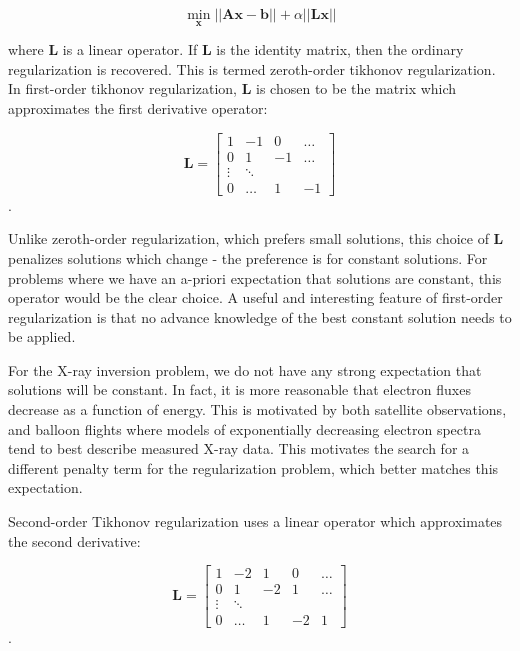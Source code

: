 $$\min_{\mathbf{x}} \vert \vert \mathbf{A} \mathbf{x} - \mathbf{b} \vert \vert + \alpha \vert \vert \mathbf{L} \mathbf{x} \vert \vert$$

where $\mathbf{L}$ is a linear operator. If $\mathbf{L}$ is the identity matrix, then the ordinary regularization is recovered. This is termed zeroth-order tikhonov regularization. In first-order tikhonov regularization, $\mathbf{L}$ is chosen to be the matrix which approximates the first derivative operator:

\[
\mathbf{L} = \begin{bmatrix} 
    1 & -1 & 0 & \dots \\
    0 & 1 & -1 &\dots \\
    \vdots & \ddots & \\
    0 & \dots & 1 & -1 
    \end{bmatrix}
\].

Unlike zeroth-order regularization, which prefers small solutions, this choice of $\mathbf{L}$ penalizes solutions which change - the preference is for constant solutions. For problems where we have an a-priori expectation that solutions are constant, this operator would be the clear choice. A useful and interesting feature of first-order regularization is that no advance knowledge of the best constant solution needs to be applied. 

For the X-ray inversion problem, we do not have any strong expectation that solutions will be constant. In fact, it is more reasonable that electron fluxes decrease as a function of energy. This is motivated by both satellite observations, and balloon flights where models of exponentially decreasing electron spectra tend to best describe measured X-ray data. This motivates the search for a different penalty term for the regularization problem, which better matches this expectation. 

Second-order Tikhonov regularization uses a linear operator which approximates the second derivative:

\[
\mathbf{L} = \begin{bmatrix} 
    1 & -2 & 1 & 0 & \dots \\
    0 & 1 & -2 & 1 & \dots \\
    \vdots & \ddots & \\
    0 & \dots & 1 & -2 & 1 
    \end{bmatrix}
\].

